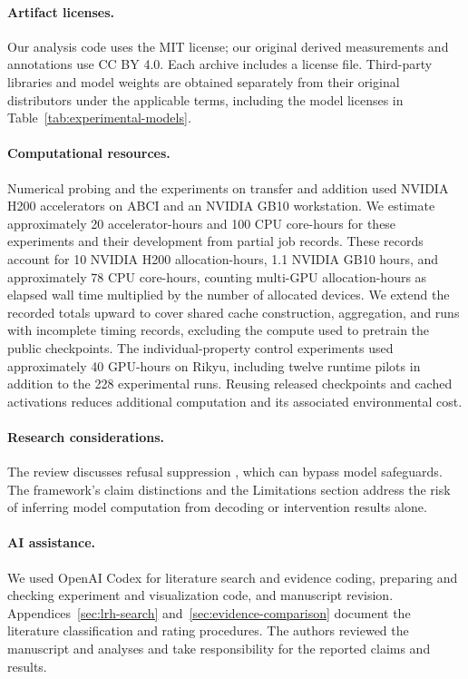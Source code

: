 \documentclass[11pt]{article}
\begin{document}
\paragraph{Artifact licenses.}

Our analysis code uses the MIT license; our original derived measurements and annotations use CC BY 4.0.
Each archive includes a license file.
Third-party libraries and model weights are obtained separately from their original distributors under the applicable terms, including the model licenses in Table~\ref{tab:experimental-models}.

\paragraph{Computational resources.}

Numerical probing and the experiments on transfer and addition used NVIDIA H200 accelerators on ABCI and an NVIDIA GB10 workstation.
We estimate approximately 20 accelerator-hours and 100 CPU core-hours for these experiments and their development from partial job records.
These records account for 10 NVIDIA H200 allocation-hours, 1.1 NVIDIA GB10 hours, and approximately 78 CPU core-hours, counting multi-GPU allocation-hours as elapsed wall time multiplied by the number of allocated devices.
We extend the recorded totals upward to cover shared cache construction, aggregation, and runs with incomplete timing records, excluding the compute used to pretrain the public checkpoints.
The individual-property control experiments used approximately 40 GPU-hours on Rikyu, including twelve runtime pilots in addition to the 228 experimental runs.
Reusing released checkpoints and cached activations reduces additional computation and its associated environmental cost.

\paragraph{Research considerations.}

The review discusses refusal suppression \citep{arditi2024refusal}, which can bypass model safeguards.
The framework's claim distinctions and the Limitations section address the risk of inferring model computation from decoding or intervention results alone.

\paragraph{AI assistance.}

We used OpenAI Codex for literature search and evidence coding, preparing and checking experiment and visualization code, and manuscript revision.
Appendices~\ref{sec:lrh-search} and~\ref{sec:evidence-comparison} document the literature classification and rating procedures.
The authors reviewed the manuscript and analyses and take responsibility for the reported claims and results.
\end{document}
